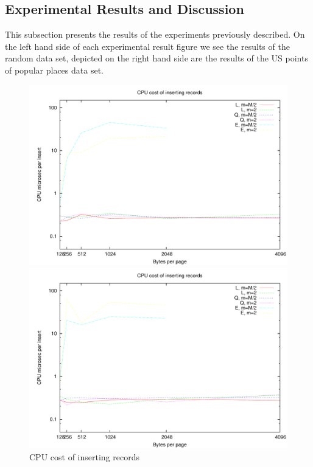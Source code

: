 \subsection{Experimental Results and Discussion}
This subsection presents the results of the experiments previously described. On the left hand side of each experimental result figure we see the results of the random data set, depicted on the right hand side are the results of the US points of popular places data set.

\begin{figure}[h]
\centering
\begin{minipage}{0.49\textwidth}
\centering
\includegraphics[width=\textwidth]{fig/random/figure-4-2.pdf}
\end{minipage}
\begin{minipage}{0.49\textwidth}
\centering
\includegraphics[width=\textwidth]{fig/usppp/figure-4-2.pdf}
\end{minipage}
\caption{CPU cost of inserting records}
\label{fig:4.2}
\end{figure}

